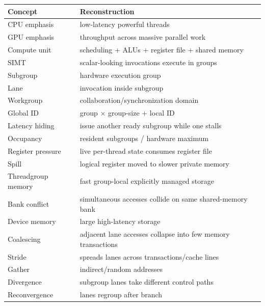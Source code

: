 {\def\LTcaptype{none} %
\begin{longtable}[]{@{}
  >{\raggedright\arraybackslash}p{}
  >{\raggedright\arraybackslash}p{}@{}}
\toprule\noalign{}
\begin{minipage}[b]{\linewidth}\raggedright
Concept
\end{minipage} & \begin{minipage}[b]{\linewidth}\raggedright
Reconstruction
\end{minipage} \\
\midrule\noalign{}
\endhead
\bottomrule\noalign{}
\endlastfoot
CPU emphasis & low-latency powerful threads \\
GPU emphasis & throughput across massive parallel work \\
Compute unit & scheduling + ALUs + register file + shared memory \\
SIMT & scalar-looking invocations execute in groups \\
Subgroup & hardware execution group \\
Lane & invocation inside subgroup \\
Workgroup & collaboration/synchronization domain \\
Global ID & group × group-size + local ID \\
Latency hiding & issue another ready subgroup while one stalls \\
Occupancy & resident subgroups / hardware maximum \\
Register pressure & live per-thread state consumes register file \\
Spill & logical register moved to slower private memory \\
Threadgroup memory & fast group-local explicitly managed storage \\
Bank conflict & simultaneous accesses collide on same shared-memory bank \\
Device memory & large high-latency storage \\
Coalescing & adjacent lane accesses collapse into few memory transactions \\
Stride & spreads lanes across transactions/cache lines \\
Gather & indirect/random addresses \\
Divergence & subgroup lanes take different control paths \\
Reconvergence & lanes regroup after branch \\

\end{longtable}}
